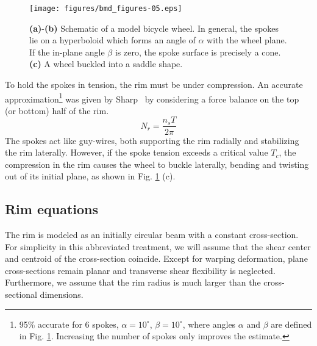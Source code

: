 \documentclass{bmd2016p}
\begin{document}
\begin{figure}[!h]
\centering
\texttt{[image: figures/bmd\_figures-05.eps]}
\caption{\textbf{(a)}-\textbf{(b)} Schematic of a model bicycle wheel. In general, the spokes lie on a hyperboloid which forms an angle of $\alpha$ with the wheel plane. If the in-plane angle $\beta$ is zero, the spoke surface is precisely a cone. \textbf{(c)} A wheel buckled into a saddle shape.}
\label{fig:schematic}
\end{figure}

To hold the spokes in tension, the rim must be under compression. An accurate approximation\footnote{95\% accurate for 6 spokes, $\alpha=10^{\circ}$, $\beta=10^{\circ}$, where angles $\alpha$ and $\beta$ are defined in Fig. \ref{fig:schematic}. Increasing the number of spokes only improves the estimate.} was given by Sharp~\cite{Sharp1977a} by considering a force balance on the top (or bottom) half of the rim.
	\begin{equation}\label{eq:TN}
	N_r = \frac{n_sT}{2\pi}
	\end{equation}
The spokes act like guy-wires, both supporting the rim radially and stabilizing the rim laterally. However, if the spoke tension exceeds a critical value $T_c$, the compression in the rim causes the wheel to buckle laterally, bending and twisting out of its initial plane, as shown in Fig. \ref{fig:schematic} (c).


\subsection{Rim equations}

The rim is modeled as an initially circular beam with a constant cross-section. For simplicity in this abbreviated treatment, we will assume that the shear center and centroid of the cross-section coincide. Except for warping deformation, plane cross-sections remain planar and transverse shear flexibility is neglected. Furthermore, we assume that the rim radius is much larger than the cross-sectional dimensions.
\end{document}
